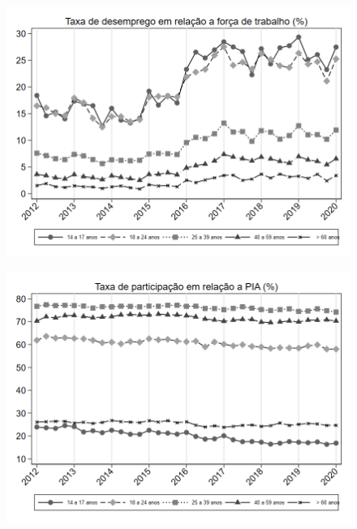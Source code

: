 \begin{frame}[label=_composicao_demografica_faixa_etaria_taxa_de_desemprego]{}
\textit{\hyperlink{_composicao_demografica_faixa_etaria}{}}
\begin{figure}
  \centering
  \includegraphics[width=1.0\linewidth]{../../analysis/output/composicao_demografica/faixa_etaria/_composicao_demografica_faixa_etaria_taxa_de_desemprego.png}
  \caption{}
  \label{fig:_composicao_demografica_faixa_etaria_taxa_de_desemprego}
\end{figure}
\end{frame}

\begin{frame}[label=_composicao_demografica_faixa_etaria_taxa_de_participacao]{}
\textit{\hyperlink{_composicao_demografica_faixa_etaria}{}}
\begin{figure}
  \centering
  \includegraphics[width=1.0\linewidth]{../../analysis/output/composicao_demografica/faixa_etaria/_composicao_demografica_faixa_etaria_taxa_de_participacao.png}
  \caption{}
  \label{fig:_composicao_demografica_faixa_etaria_taxa_de_participacao}
\end{figure}
\end{frame}

